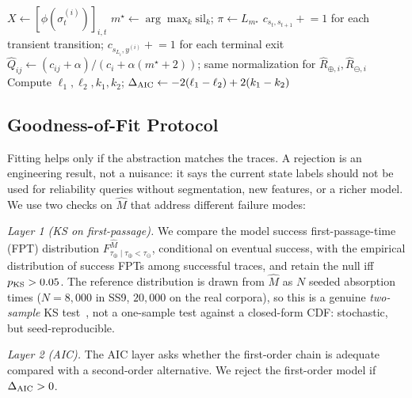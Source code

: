 \begin{algorithm}[t]
\small
\DontPrintSemicolon
{}
$X \leftarrow [\phi(\sigma_t^{(i)})]_{i,t}$
$m^\star \leftarrow \arg\max_k \mathrm{sil}_k$;\quad
$\pi \leftarrow L_{m^\star}$\;
$c_{s_t,s_{t+1}}\mathrel{+}=1$ for each transient transition;
$c_{s_{L_i},y^{(i)}}\mathrel{+}=1$ for each terminal exit\;
$\hat{Q}_{ij} \leftarrow (c_{ij} + \alpha) / (c_i + \alpha(m^\star + 2))$;
same normalization for $\hat{R}_{\oplus,i},\hat{R}_{\ominus,i}$\;
Compute $\ell_1, \ell_2, k_1, k_2$;\quad
$\Delta_{\rm AIC} \leftarrow -2(\ell_1 - \ell_2) + 2(k_1 - k_2)$\;
\;
\caption{\textsc{TraceToChain}: construct and audit an absorbing DTMC
         from agent execution traces.}
\label{alg:trace}
\end{algorithm}

\subsection{Goodness-of-Fit Protocol}
\label{sec:gof}

Fitting helps only if the abstraction matches the traces. A rejection
is an engineering result, not a nuisance: it says the current state
labels should not be used for reliability queries without segmentation,
new features, or a richer model. We use two checks on $\hat M$ that
address different failure modes:

\emph{Layer 1 (KS on first-passage).} We compare the model
success first-passage-time (FPT) distribution
$F_{\tau_\oplus \mid \tau_\oplus < \tau_\ominus}^{\hat M}$, conditional
on eventual success, with the empirical distribution of success FPTs
among successful traces, and retain the null iff $p_{\rm KS} > 0.05$.
The reference distribution is drawn from $\hat M$ as $N$ seeded
absorption times ($N=8{,}000$ in SS9, $20{,}000$ on the real corpora),
so this is a genuine \emph{two-sample} KS test~\cite{smirnov1939}, not a
one-sample test against a closed-form CDF: stochastic, but
seed-reproducible.

\emph{Layer 2 (AIC).} The AIC layer asks whether the first-order
chain is adequate compared with a second-order alternative. We reject
the first-order model if $\Delta_{\rm AIC} > 0$.

